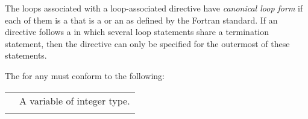 \begin{fortranspecific}

The loops associated with a loop-associated directive have \emph{canonical loop form} 
if each of them is a  that is a  or an
 as defined by the Fortran standard. If an
~ directive follows a  in which several
loop statements share a  termination statement, then the directive
can only be specified for the outermost of these  statements.

The  for any  must conform to the following:

\medskip
\nolinenumbers
\renewcommand{\arraystretch}{1.0}
\tablelasttail{\hline}
\begin{supertabular}{ p{0.8in} p{4.5in}}
    {} & A variable of integer type.\\
    & \\


\end{supertabular}
\end{fortranspecific}
